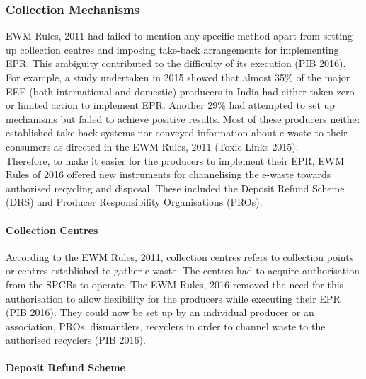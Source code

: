 \documentclass[a4paper, 12pt]{article}
\begin{document}
                    \subsubsection{Collection Mechanisms}
                    
                    EWM Rules, 2011 had failed to mention any specific method apart from setting up collection centres and imposing take-back arrangements for implementing EPR. This ambiguity contributed to the difficulty of its execution (PIB 2016). For example, a study undertaken in 2015 showed that almost 35\% of the major EEE (both international and domestic) producers in India had either taken zero or limited action to implement EPR. Another 29\% had attempted to set up mechanisms but failed to achieve positive results. Most of these producers neither established take-back systems nor conveyed information about e-waste to their consumers as directed in the EWM Rules, 2011 (Toxic Links 2015).\\
                    
                    Therefore, to make it easier for the producers to implement their EPR, EWM Rules of 2016 offered new instruments for channelising the e-waste towards authorised recycling and disposal. These included the Deposit Refund Scheme (DRS) and Producer Responsibility Organisations (PROs). \\
                    
                    \paragraph{Collection Centres}
                    
                    According to the EWM Rules, 2011, collection centres refers to collection points or centres established to gather e-waste. The centres had to acquire authorisation from the SPCBs to operate. The EWM Rules, 2016 removed the need for this authorisation to allow flexibility for the producers while executing their EPR (PIB 2016). They could now be set up by an individual producer or an association, PROs, dismantlers, recyclers in order to channel waste to the authorised recyclers (PIB 2016).\\
                    
                    \paragraph{Deposit Refund Scheme}
                    
\end{document}
